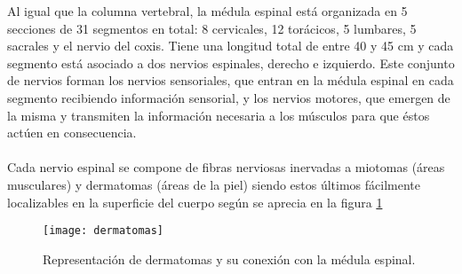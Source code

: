Al igual que la columna vertebral, la médula espinal está organizada en 5 secciones de 31 segmentos en total: 8 cervicales, 12 torácicos, 5 lumbares, 5 sacrales y el nervio del coxis. Tiene una longitud total de entre 40 y 45 cm y cada segmento está asociado a dos nervios espinales, derecho e izquierdo. Este conjunto de nervios forman los nervios sensoriales, que entran en la médula espinal en cada segmento recibiendo información sensorial, y los nervios motores, que emergen de la misma y transmiten la información necesaria a los músculos para que éstos actúen en consecuencia.\cite{anatomia_medula_1}
\\
\\
Cada nervio espinal se compone de fibras nerviosas inervadas a miotomas (áreas musculares) y dermatomas (áreas de la piel)\cite{sci_clasificacion} siendo estos últimos fácilmente localizables en la superficie del cuerpo según se aprecia en la figura \ref{fig:dermatomas}\\

\begin{figure}[!htb]
\centering
\texttt{[image: dermatomas]}
  \caption{Representación de dermatomas y su conexión con la médula espinal\cite{dermatomas}.}\label{fig:dermatomas}
\end{figure}


